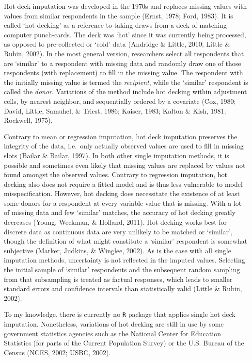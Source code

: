 \documentclass[12pt,econ]{sources/authesis}
\begin{document}
Hot deck imputation was developed in the 1970s and replaces missing values with values from similar respondents in the sample (Ernst, 1978; Ford, 1983). It is called `hot decking' as a reference to taking draws from a deck of matching computer punch-cards. The deck was `hot' since it was currently being processed, as opposed to pre-collected or `cold' data (Andridge \& Little, 2010; Little \& Rubin, 2002). In the most general version, researchers select all respondents that are `similar' to a respondent with missing data and randomly draw one of those respondents (with replacement) to fill in the missing value. The respondent with the initially missing value is termed the \textit{recipient}, while the `similar' respondent is called the \textit{donor}. Variations of the method include hot decking within adjustment cells, by nearest neighbor, and sequentially ordered by a covariate (Cox, 1980; David, Little, Samuhel, \& Triest, 1986; Kaiser, 1983; Kalton \& Kish, 1981; Rockwell, 1975).

Contrary to mean or regression imputation, hot deck imputation preserves the integrity of the data, i.e.~only actually observed values are used to fill in missing slots (Bailar \& Bailar, 1997). In both other single imputation methods, it is possible and sometimes even likely that missing values are replaced by values not found amongst the observed values. Contrary to regression imputation, hot decking also does not require a fitted model and is thus less vulnerable to model misspecification. However, hot decking does necessitate the existence of at least some donors for a respondent at every variable value that is missing. With a lot of missing data and few `similar' matches, the accuracy of hot decking greatly decreases (Young, Weckman, \& Holland, 2011). Hot decking works best for discrete data as continuous data are very unlikely to be matched or `similar', though the definition of what might constitute a `similar' respondent is somewhat subjective (Marker, Judkins, \& Winglee, 2002). As is the case with all single imputation methods, uncertainty is not reflected in the imputed values. Selecting the initial sample of `similar' respondents and the subsequent random sampling from that subsampling is treated as factual responses, which leads to smaller standard errors and confidence intervals than statistically valid (Little \& Rubin, 2002).

To my knowledge, there is currently no \texttt{R} package that applies single hot deck imputation. Nonetheless, variations of hot decking are still in use by some government statistics agencies such as the National Center for Education Statistics (for parts of the Current Population Survey) or the U.S. Bureau of the Census (NCES, 2002; USBC, 2002).
\end{document}
